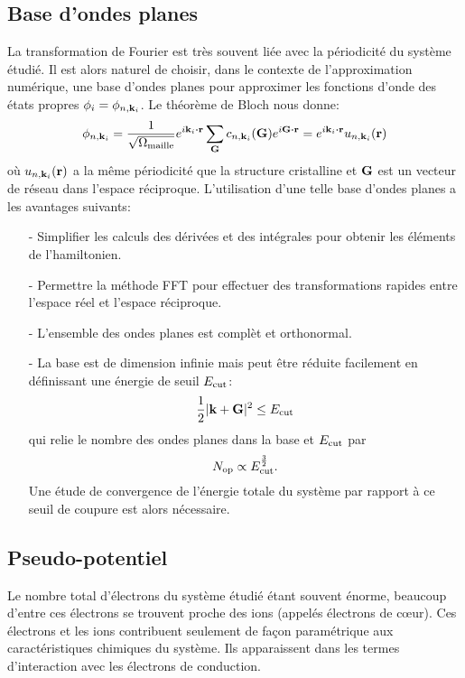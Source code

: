 \subsection{Base d'ondes planes}
\label{subsec-planewave}
La transformation de Fourier est très souvent liée avec la périodicité du système étudié.
Il est alors naturel de choisir, dans le contexte de l'approximation numérique,
une base d'ondes planes pour approximer les fonctions d'onde des états propres $\phi_i = \phi_{n,\vb{k}_i}$.
Le théorème de Bloch nous donne:
\begin{equation*}
  \phi_{n,\vb{k}_i}
  = \frac{1}{\sqrt{\Omega_{\V{maille}}}}e^{i\vb{k}_i\vdot\vb{r}}\sum_{\vb{G}} c_{n,\vb{k}_i}(\vb{G})e^{i\vb{G}\vdot\vb{r}}
  = e^{i\vb{k}_i\vdot\vb{r}} u_{n,\vb{k}_i}(\vb{r})
\end{equation*}
où $u_{n,\vb{k}_i}(\vb{r})$ a la même périodicité que la structure cristalline
et $\vb{G}$ est un vecteur de réseau dans l'espace réciproque.
L'utilisation d'une telle base d'ondes planes a les avantages suivants:
\begin{itemize}
  \item[-] Simplifier les calculs des dérivées et des intégrales pour obtenir les éléments de l'hamiltonien.
  \item[-] Permettre la méthode FFT pour effectuer des transformations rapides entre l'espace réel et l'espace réciproque.
  \item[-] L'ensemble des ondes planes est complèt et orthonormal.
  \item[-] La base est de dimension infinie mais peut être réduite facilement
    en définissant une énergie de seuil $E_{\textnormal{cut}}$:
    \begin{equation}
      \frac{1}{2}|\vb{k}+\vb{G}|^2 \leq E_{\textnormal{cut}}
    \end{equation}
    qui relie le nombre des ondes planes dans la base et $E_{\textnormal{cut}}$ par
    \begin{equation}
      N_{\textnormal{op}}\propto E_{\textnormal{cut}}^{\frac{3}{2}}.
    \end{equation}
    Une étude de convergence de l'énergie totale du système par rapport à ce seuil de coupure est alors nécessaire.
\end{itemize}

\subsection{Pseudo-potentiel}
\label{subsec-pseudo}
Le nombre total d'électrons du système étudié étant souvent énorme,
beaucoup d'entre ces électrons se trouvent proche des ions (appelés électrons de cœur).
Ces électrons et les ions contribuent seulement de façon paramétrique
aux caractéristiques chimiques du système.
Ils apparaissent dans les termes d'interaction avec les électrons de conduction.

